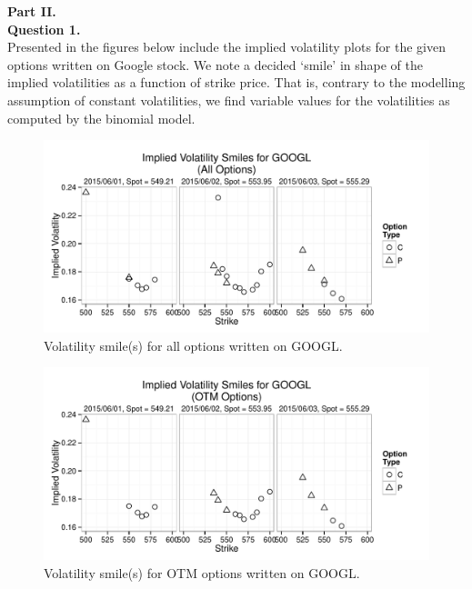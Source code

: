 \documentclass[12pt]{article}
\newlength\tindent
\renewcommand{\indent}{\hspace*{\tindent}}
\begin{document}
 
 
\newpage
{\bf Part II.} \\

{\bf Question 1.} \\

\indent Presented in the figures below include the implied volatility plots for the given options written on Google stock. We note a decided `smile' in shape of the implied volatilities as a function of strike price. That is, contrary to the modelling assumption of constant volatilities, we find variable values for the volatilities as computed by the binomial model.

\begin{figure}[H]
	\centering
 	\includegraphics[scale=0.85]{../plots/smile_all.pdf}
\caption{\footnotesize Volatility smile(s) for all options written on GOOGL.}
\end{figure}

\begin{figure}[H]
	\centering
 	\includegraphics[scale=0.85]{../plots/smile_OTM.pdf}
\caption{\footnotesize Volatility smile(s) for OTM options written on GOOGL.}
\end{figure}
\end{document}
